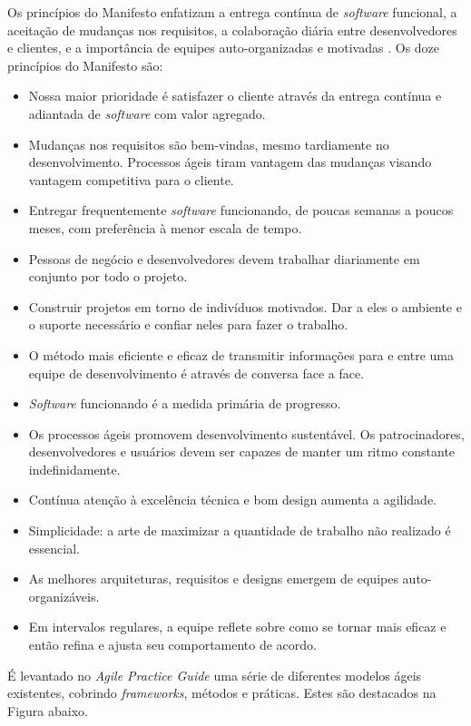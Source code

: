 \documentclass[
	12pt,
	openright,
	twoside,
	a4paper,
	english,
	brazil
	]{abntex2}
\begin{document}
Os princípios do Manifesto enfatizam a entrega contínua de \textit{software} funcional, a aceitação de mudanças nos requisitos, a colaboração diária entre desenvolvedores e clientes, e a importância de equipes auto-organizadas e motivadas \cite{AgileManifest}. Os doze princípios do Manifesto são:
\begin{itemize}
  \item Nossa maior prioridade é satisfazer o cliente através da entrega contínua e adiantada de \textit{software} com valor agregado.
  \item Mudanças nos requisitos são bem-vindas, mesmo tardiamente no desenvolvimento. Processos ágeis tiram vantagem das mudanças visando vantagem competitiva para o cliente.
  \item Entregar frequentemente \textit{software} funcionando, de poucas semanas a poucos meses, com preferência à menor escala de tempo.
  \item Pessoas de negócio e desenvolvedores devem trabalhar diariamente em conjunto por todo o projeto.
  \item Construir projetos em torno de indivíduos motivados. Dar a eles o ambiente e o suporte necessário e confiar neles para fazer o trabalho.
  \item O método mais eficiente e eficaz de transmitir informações para e entre uma equipe de desenvolvimento é através de conversa face a face.
  \item \textit{Software} funcionando é a medida primária de progresso.
  \item Os processos ágeis promovem desenvolvimento sustentável. Os patrocinadores, desenvolvedores e usuários devem ser capazes de manter um ritmo constante indefinidamente.
  \item Contínua atenção à excelência técnica e bom design aumenta a agilidade.
  \item Simplicidade: a arte de maximizar a quantidade de trabalho não realizado é essencial.
  \item As melhores arquiteturas, requisitos e designs emergem de equipes auto-organizáveis.
  \item Em intervalos regulares, a equipe reflete sobre como se tornar mais eficaz e então refina e ajusta seu comportamento de acordo.
\end{itemize}

É levantado no \textit{Agile Practice Guide} \cite{AgileGuide} uma série de diferentes modelos ágeis existentes, cobrindo \textit{frameworks}, métodos e práticas. Estes são destacados na Figura abaixo.
\end{document}
